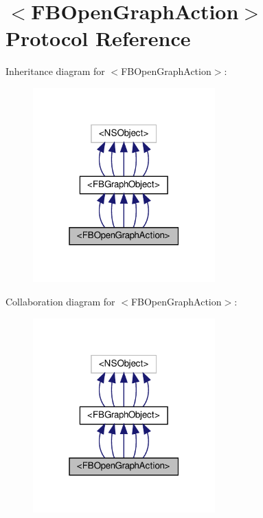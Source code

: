 \hypertarget{protocolFBOpenGraphAction-p}{}\section{$<$F\+B\+Open\+Graph\+Action$>$ Protocol Reference}
\label{protocolFBOpenGraphAction-p}


Inheritance diagram for $<$F\+B\+Open\+Graph\+Action$>$\+:
\nopagebreak
\begin{figure}[H]
\begin{center}
\leavevmode
\includegraphics[width=199pt]{protocolFBOpenGraphAction-p__inherit__graph}
\end{center}
\end{figure}


Collaboration diagram for $<$F\+B\+Open\+Graph\+Action$>$\+:
\nopagebreak
\begin{figure}[H]
\begin{center}
\leavevmode
\includegraphics[width=199pt]{protocolFBOpenGraphAction-p__coll__graph}
\end{center}
\end{figure}

